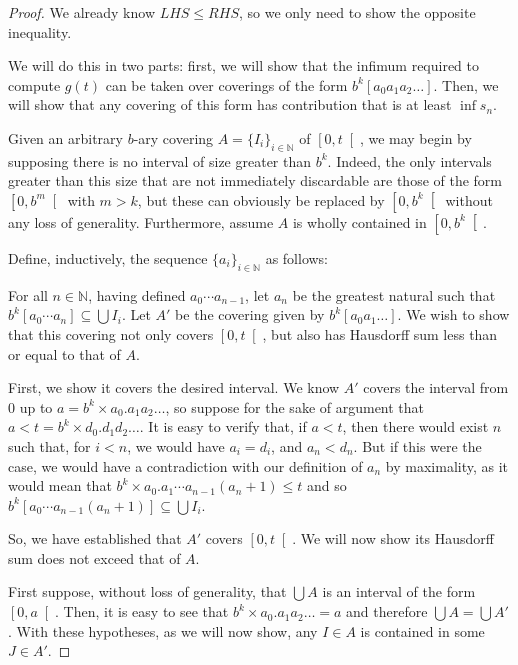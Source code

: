 \documentclass[11pt, reqno]{amsart}
\newcommand{\N}{\mathbb{N}}
\begin{document}
\begin{proof}
We already know $LHS \leq RHS$, so we only need to show the opposite inequality.

We will do this in two parts: first, we will show that the infimum required to compute $g(t)$ can be taken over coverings of the form $b^k [a_0 a_1 a_2 \dots]$. Then, we will show that any covering of this form has contribution that is at least $\inf s_n$.

Given an arbitrary $b$-ary covering $A = \{ I_i \}_{i \in \N}$ of $\left[ 0, t \right[$,
we may begin by supposing there is no interval of size greater than $b^k$. Indeed, the only intervals greater than this size that are not immediately discardable are those of the form $\left[0, b^m \right[$ with $m > k$, but these can obviously be replaced by $\left[0, b^k \right[$ without any loss of generality. Furthermore, assume $A$ is wholly contained in $\left[0, b^k \right[$.

Define, inductively, the sequence $\{a_i\}_{i \in \N}$ as follows:

For all $n \in \N$, having defined $a_0 \cdots a_{n-1}$, let $a_n$ be the greatest natural such that $b^k [a_0 \cdots a_n] \subseteq \bigcup I_i$. Let $A'$ be the covering given by $b^k [a_0 a_1 \dots]$. We wish to show that this covering not only covers $\left[0, t \right[$, but also has Hausdorff sum less than or equal to that of $A$.

First, we show it covers the desired interval. We know $A'$ covers the interval from 0 up to $a = b^k \times a_0 . a_1 a_2 \dots$, so suppose for the sake of argument that $a < t = b^k \times d_0 . d_1 d_2 \dots$. It is easy to verify that, if $a < t$, then there would exist $n$ such that, for $i < n$, we would have $a_i = d_i$, and $a_n < d_n$. But if this were the case, we would have a contradiction with our definition of $a_n$ by maximality, as it would mean that $b^k \times a_0 . a_1 \cdots a_{n-1} (a_n + 1) \leq t$ and so $b^k [a_0 \cdots a_{n-1} (a_n + 1)] \subseteq \bigcup I_i$.

So, we have established that $A'$ covers $\left[0, t\right[$. We will now show its Hausdorff sum does not exceed that of $A$.

First suppose, without loss of generality, that $\bigcup A$ is an interval of the form $\left[0,a\right[$. Then, it is easy to see that $b^k \times a_0 . a_1 a_2 \dots = a$ and therefore $\bigcup A = \bigcup A'$. With these hypotheses, as we will now show, any $I \in A$ is contained in some $J \in A'$.


\end{proof}
\end{document}
